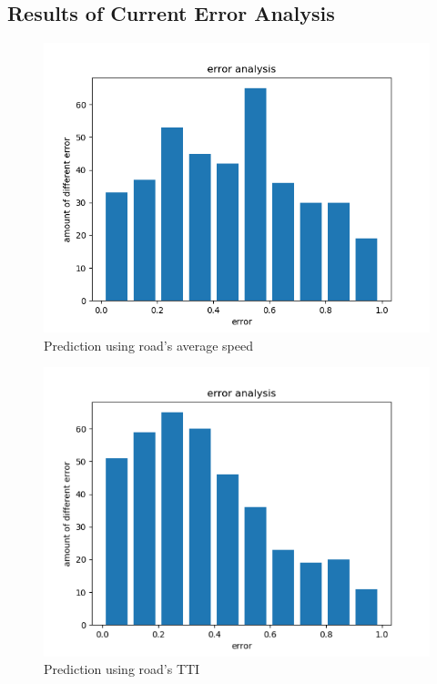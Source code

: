 \documentclass[fontset=none]{ctexart}
\theoremstyle{definition}
\theoremstyle{remark}
\begin{document}
\subsection{Results of Current Error Analysis}
\begin{figure}[htb]
  \centering
  \includegraphics[width=\textwidth]{images/error1.png}
  \caption{Prediction using road's average speed}
  \label{error1}
\end{figure}

\begin{figure}[htb]
  \centering
  \includegraphics[width=\textwidth]{images/error2.png}
  \caption{Prediction using road's TTI}
  \label{error2}
\end{figure}
\end{document}
